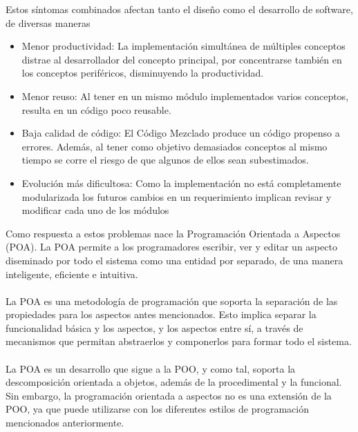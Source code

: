 Estos síntomas combinados afectan tanto el diseño como el desarrollo de
software, de diversas maneras

\begin{itemize}
  
	\item Menor productividad: La implementación simultánea de múltiples
	conceptos distrae al desarrollador del concepto principal, por
	concentrarse también en los conceptos periféricos, disminuyendo la
	productividad.
  
  \item Menor reuso: Al tener en un mismo módulo implementados varios
	conceptos, resulta en un código poco reusable.
	
	\item Baja calidad de código: El Código Mezclado produce un código
	propenso a errores. Además, al tener como objetivo demasiados
	conceptos al mismo tiempo se corre el riesgo de que algunos de ellos
	sean subestimados.
	
	\item Evolución más dificultosa: Como la implementación no está
	completamente modularizada los futuros cambios en un
	requerimiento implican revisar y modificar cada uno de los módulos
  
\end{itemize}

Como respuesta a estos problemas nace la Programación Orientada a Aspectos
(POA). La POA permite a los programadores escribir, ver y editar un aspecto
diseminado por todo el sistema como una entidad por separado, de una manera
inteligente, eficiente e intuitiva.\\ \\

La POA es una metodología de programación que soporta la
separación de las propiedades para los aspectos antes mencionados. Esto implica
separar la funcionalidad básica y los aspectos, y los aspectos entre sí, a través de
mecanismos que permitan abstraerlos y componerlos para formar todo el sistema.
\\\\

La POA es un desarrollo que sigue a la POO, y como tal, soporta la
descomposición orientada a objetos, además de la procedimental y la funcional. Sin
embargo, la programación orientada a aspectos no es una extensión de la POO, ya
que puede utilizarse con los diferentes estilos de programación mencionados
anteriormente.







